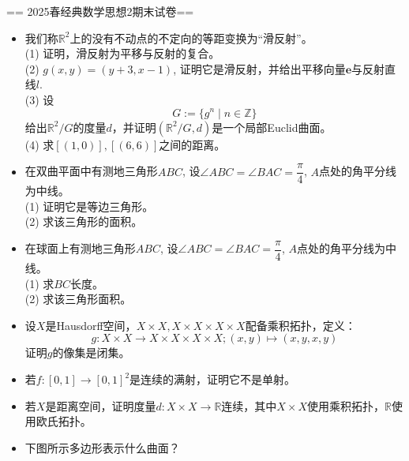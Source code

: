 == 2025春经典数学思想2期末试卷==

\begin{itemize}
\item[一、] 我们称$\mathbb{R}^2$上的没有不动点的不定向的等距变换为“滑反射”。\\
(1) 证明，滑反射为平移与反射的复合。\\
(2) $g(x,y)=(y+3,x-1)$, 证明它是滑反射，并给出平移向量$\mathbf{e}$与反射直线$l$.\\
(3) 设
    $$G:=\{g^n\mid n\in\mathbb{Z}\}$$
    给出$\mathbb{R}^2/G$的度量$d$，并证明$(\mathbb{R}^2/G,d)$是一个局部Euclid曲面。\\
(4) 求$[(1,0)],[(6,6)]$之间的距离。\\
\item[二、] 在双曲平面中有测地三角形$ABC$, 设$\angle ABC=\angle BAC=\dfrac\pi4$, $A$点处的角平分线为中线。\\
(1) 证明它是等边三角形。\\
(2) 求该三角形的面积。\\
\item[三、] 在球面上有测地三角形$ABC$, 设$\angle ABC=\angle BAC=\dfrac\pi4$, $A$点处的角平分线为中线。\\
(1) 求$BC$长度。\\
(2) 求该三角形面积。\\
\item[四、]设$X$是Hausdorff空间，$X\times X,X\times X\times X \times X$配备乘积拓扑，定义：
$$g:X\times X\rightarrow X\times X\times X\times X;(x,y)\mapsto(x,y,x,y)$$
证明$g$的像集是闭集。
\item[五、]若$f:[0,1]\rightarrow[0,1]^2$是连续的满射，证明它不是单射。
\item[六、]若$X$是距离空间，证明度量$d:X\times X\rightarrow \mathbb{R}$连续，其中$X\times X$使用乘积拓扑，$\mathbb{R}$使用欧氏拓扑。
\item[七、]下图所示多边形表示什么曲面？
\end{itemize}
